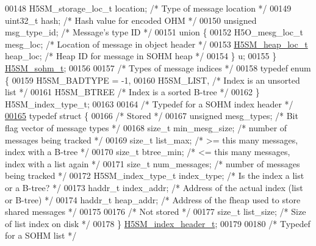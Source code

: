 \begin{DoxyCode}
00148     H5SM\_storage\_loc\_t location;        \textcolor{comment}{/* Type of message location */}
00149     uint32\_t hash;              \textcolor{comment}{/* Hash value for encoded OHM */}
00150     \textcolor{keywordtype}{unsigned} msg\_type\_id;               \textcolor{comment}{/* Message's type ID */}
00151     \textcolor{keyword}{union }\{
00152         H5O\_mesg\_loc\_t mesg\_loc;        \textcolor{comment}{/* Location of message in object header */}
00153         \hyperlink{struct_h5_s_m__heap__loc__t}{H5SM\_heap\_loc\_t} heap\_loc;       \textcolor{comment}{/* Heap ID for message in SOHM heap */}
00154     \} u;
00155 \} \hyperlink{struct_h5_s_m__sohm__t}{H5SM\_sohm\_t};
00156 
00157 \textcolor{comment}{/* Types of message indices */}
00158 \textcolor{keyword}{typedef} \textcolor{keyword}{enum} \{
00159     H5SM\_BADTYPE = -1,
00160     H5SM\_LIST,          \textcolor{comment}{/* Index is an unsorted list */}
00161     H5SM\_BTREE          \textcolor{comment}{/* Index is a sorted B-tree */}
00162 \} H5SM\_index\_type\_t;
00163 
00164 \textcolor{comment}{/* Typedef for a SOHM index header */}
\hyperlink{struct_h5_s_m__index__header__t}{00165} \textcolor{keyword}{typedef} \textcolor{keyword}{struct }\{
00166 \textcolor{comment}{/* Stored */}
00167     \textcolor{keywordtype}{unsigned} mesg\_types;    \textcolor{comment}{/* Bit flag vector of message types */}
00168     \textcolor{keywordtype}{size\_t} min\_mesg\_size;   \textcolor{comment}{/* number of messages being tracked */}
00169     \textcolor{keywordtype}{size\_t} list\_max;        \textcolor{comment}{/* >= this many messages, index with a B-tree */}
00170     \textcolor{keywordtype}{size\_t} btree\_min;       \textcolor{comment}{/* <= this many messages, index with a list again */}
00171     \textcolor{keywordtype}{size\_t} num\_messages;    \textcolor{comment}{/* number of messages being tracked */}
00172     H5SM\_index\_type\_t index\_type; \textcolor{comment}{/* Is the index a list or a B-tree? */}
00173     haddr\_t index\_addr;     \textcolor{comment}{/* Address of the actual index (list or B-tree) */}
00174     haddr\_t heap\_addr;      \textcolor{comment}{/* Address of the fheap used to store shared messages */}
00175 
00176 \textcolor{comment}{/* Not stored */}
00177     \textcolor{keywordtype}{size\_t} list\_size;           \textcolor{comment}{/* Size of list index on disk */}
00178 \} \hyperlink{struct_h5_s_m__index__header__t}{H5SM\_index\_header\_t};
00179 
00180 \textcolor{comment}{/* Typedef for a SOHM list */}

\end{DoxyCode}
